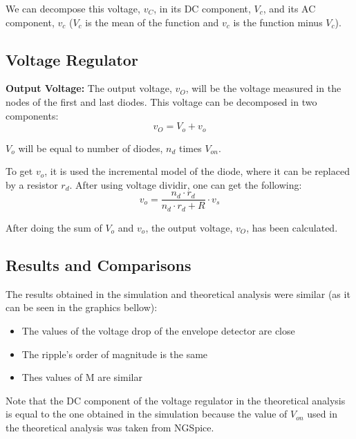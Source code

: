 We can decompose this voltage, $v_C$, in its DC component, $V_c$, and its AC component, $v_c$ ($V_c$ is the mean of the function and $v_c$ is the function minus $V_c$).


\subsection{Voltage Regulator}

\textbf{Output Voltage:}
The output voltage, $v_O$, will be the voltage measured in the nodes of the first and last diodes.
This voltage can be decomposed in two components: $$v_O = V_o + v_o$$

$V_o $ will be equal to number of diodes, $n_d$ times $V_{on}$.

To get $v_o$, it is used the incremental model of the diode, where it can be replaced by a resistor $r_d$.
After using voltage dividir, one can get the following:
$$ v_o = \frac{n_d \cdot r_d}{n_d \cdot r_d + R} \cdot v_s$$

After doing the sum of $V_o$ and $v_o$, the output voltage, $v_O$, has been calculated.





\subsection{Results and Comparisons}



The results obtained in the simulation and theoretical analysis were similar (as it can be seen in the graphics bellow):

\begin{itemize}
  \item The values of the voltage drop of the envelope detector are close
  \item The ripple's order of magnitude is the same
  \item Thes values of M are similar
\end{itemize}

Note that the DC component of the voltage regulator in the theoretical analysis is equal to the one obtained in the simulation because the value of $V_{on}$ used in the theoretical analysis was taken from NGSpice. 

